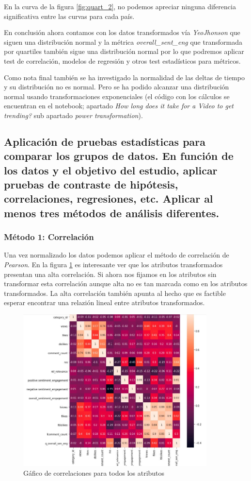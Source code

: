 \documentclass[a4paper,12pt]{article}
\begin{document}
En la curva de la figura \ref{fig:quart_2}, no podemos apreciar ninguna diferencia significativa entre las curvas para cada pa\'is.

En conclusi\'on ahora contamos con los datos transformados  v\'ia {\itshape Yeo\-Jhonson} que siguen una distribuci\'on normal y la m\'etrica {\itshape overall\_sent\_eng} que transformada por quartiles tambi\'en sigue una distribuci\'on normal por lo que podremos aplicar test de correlaci\'on, modelos de regresi\'on y otros test estad\'isticos para m\'etricos.

Como nota final tambi\'en se ha investigado la normalidad de las deltas de tiempo y su distribuci\'on no es normal. Pero se ha podido alcanzar una distribuci\'on normal usando transformaciones exponenciales (el c\'odigo con los c\'alculos se encuentran en el notebook; apartado {\itshape How long does it take for a Video to get trending?} sub apartado {\itshape power transformation}).

\subsection[item_pruebas]{Aplicaci\'on de pruebas estad\'isticas para comparar los grupos de datos. En funci\'on de los datos y el objetivo del estudio, aplicar pruebas de contraste de hip\'otesis, correlaciones, regresiones, etc. Aplicar al menos tres m\'etodos de an\'alisis diferentes.}


\subsubsection{M\'etodo 1: Correlaci\'on}

Una vez normalizado los datos podemos aplicar el m\'etodo de correlaci\'on de {\itshape Pearson}. En la figura \ref{fig:corrplot} es interesante ver que los atributos transformados presentan una alta correlaci\'on. Si ahora nos fijamos en los atributos sin transformar esta correlaci\'on aunque alta no es tan marcada como en los atributos transformados.  La alta correlaci\'on tambi\'en apunta al hecho que es factible esperar encontrar una relazi\'on lineal entre atributos transformados.
 
\begin{figure}[h!]
\centering
\includegraphics[width=10cm]{Correlation.JPG}
\caption{G\'afico de correlaciones para todos los atributos}
\label{fig:corrplot}
\end{figure}
\end{document}
